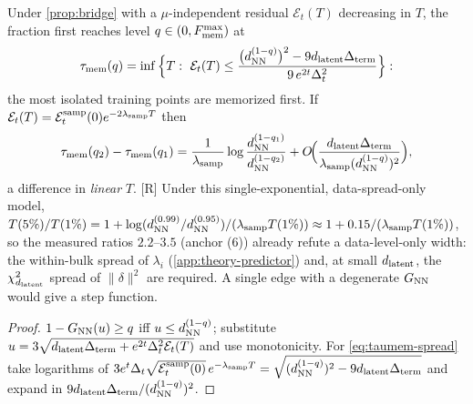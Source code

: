 \begin{corollary}\label{cor:taumem-fraction}
Under \cref{prop:bridge} with a $\mu$-independent residual $\mathcal E_t(T)$ decreasing in $T$, the fraction first reaches level $q\in(0,F^{\max}_{\rm mem})$ at
\begin{equation}\label{eq:taumem-q}
 \tau_{\mathrm{mem}}(q)=\inf\Big\{T:\ \mathcal E_t(T)\le \frac{\big(d_{\rm NN}^{(1-q)}\big)^2-9d_{\mathrm{latent}}\Delta_{\rm term}}{9\,e^{2t}\Delta_t^{2}}\Big\}:
\end{equation}
the most isolated training points are memorized first. If $\mathcal E_t(T)=\mathcal E^{\rm samp}_t(0)e^{-2\lambda_{\rm samp}T}$ then
\begin{equation}\label{eq:taumem-spread}
 \tau_{\mathrm{mem}}(q_2)-\tau_{\mathrm{mem}}(q_1)=\frac{1}{\lambda_{\rm samp}}\log\frac{d_{\rm NN}^{(1-q_1)}}{d_{\rm NN}^{(1-q_2)}}+O\!\Big(\frac{d_{\mathrm{latent}}\Delta_{\rm term}}{\lambda_{\rm samp}(d^{(1-q)}_{\rm NN})^2}\Big),
\end{equation}
a difference in \emph{linear} $T$. [R] Under this single-exponential, data-spread-only model, $T(5\%)/T(1\%)=1+\log(d^{(0.99)}_{\rm NN}/d^{(0.95)}_{\rm NN})/(\lambda_{\rm samp}T(1\%))\approx1+0.15/(\lambda_{\rm samp}T(1\%))$, so the measured ratios $2.2$--$3.5$ (anchor (6)) already refute a data-level-only width: the within-bulk spread of $\lambda_i$ (\cref{app:theory-predictor}) and, at small $d_{\mathrm{latent}}$, the $\chi^2_{d_{\mathrm{latent}}}$ spread of $\|\delta\|^2$ are required. A single edge with a degenerate $G_{\rm NN}$ would give a step function.
\end{corollary}
\begin{proof}
$1-G_{\rm NN}(u)\ge q$ iff $u\le d_{\rm NN}^{(1-q)}$; substitute $u=3\sqrt{d_{\mathrm{latent}}\Delta_{\rm term}+e^{2t}\Delta_t^2\mathcal E_t(T)}$ and use monotonicity. For \eqref{eq:taumem-spread} take logarithms of $3e^{t}\Delta_t\sqrt{\mathcal E^{\rm samp}_t(0)}\,e^{-\lambda_{\rm samp}T}=\sqrt{(d^{(1-q)}_{\rm NN})^2-9d_{\mathrm{latent}}\Delta_{\rm term}}$ and expand in $9d_{\mathrm{latent}}\Delta_{\rm term}/(d^{(1-q)}_{\rm NN})^2$.
\end{proof}

